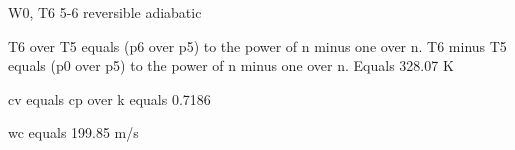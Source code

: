 W0, T6  
5-6 reversible adiabatic  

T6 over T5 equals (p6 over p5) to the power of n minus one over n.  
T6 minus T5 equals (p0 over p5) to the power of n minus one over n.  
Equals 328.07 K  

cv equals cp over k equals 0.7186  

wc equals 199.85 m/s